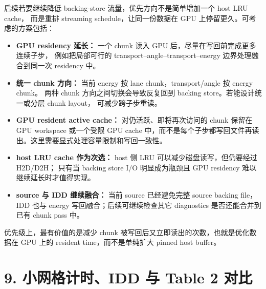 \documentclass[11pt,a4paper]{ctexart}
\begin{document}
后续若要继续降低 backing-store 流量，优先方向不是简单增加一个 host LRU cache，
而是重排 streaming schedule，让同一份数据在 GPU 上停留更久。可考虑的方案包括：
\begin{itemize}
\item \textbf{GPU residency 延长：} 一个 chunk 读入 GPU 后，尽量在写回前完成更多连续子步，
例如把局部可行的 transport--angle--transport--energy 边界处理融合到同一次 residency 中。
\item \textbf{统一 chunk 方向：} 当前 energy 按 lane chunk，transport/angle 按 energy chunk。
两种 chunk 方向之间切换会导致反复回到 backing store。若能设计统一或分层 chunk layout，
可减少跨子步重读。
\item \textbf{GPU resident active cache：} 对仍活跃、即将再次访问的 chunk 保留在 GPU workspace
或一个受限 GPU cache 中，而不是每个子步都写回文件再读出。这里需要显式处理容量限制和写回一致性。
\item \textbf{host LRU cache 作为次选：} host 侧 LRU 可以减少磁盘读写，但仍要经过 H2D/D2H；
只有当 backing store I/O 明显成为瓶颈且 GPU residency 难以继续延长时才值得实现。
\item \textbf{source 与 IDD 继续融合：} 当前 source 已经避免完整 source backing file，IDD 也与
energy 写回融合；后续可继续检查其它 diagnostics 是否还能合并到已有 chunk pass 中。
\end{itemize}

优先级上，最有价值的是减少 chunk 被写回后又立即读出的次数，也就是优化数据在 GPU 上的
resident time，而不是单纯扩大 pinned host buffer。

\section*{9. 小网格计时、IDD 与 Table 2 对比}

\end{document}
